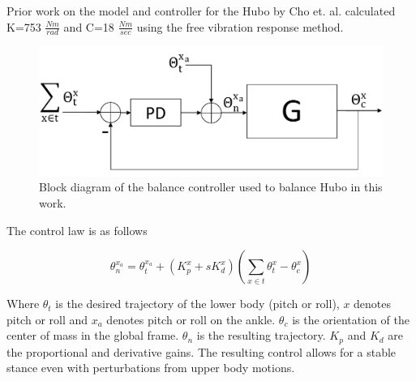 Prior work on the model and controller for the Hubo by Cho et. al. calculated K=753 $\frac{Nm}{rad}$ and C=18 $\frac{Nm}{sec}$ using the free vibration response method\cite{5379574}.


\begin{figure}[ht]
  \centering
\includegraphics[width=1.0\columnwidth]{./pix/blockDiagram3.pdf}
  \caption{Block diagram of the balance controller used to balance Hubo in this work.}
  \label{fig:ctrlBlockDiagram}
\end{figure}

The control law is as follows

\begin{equation}
\theta_n^{x_a} = \theta_t^{x_a} + \left(K_p^x+sK_d^x\right)\left(\sum\limits_{x \in t} \theta_{t}^x - \theta_{c}^x\right)
\end{equation}

Where $\theta_t$ is the desired trajectory of the lower body (pitch or roll), $x$ denotes pitch or roll and $x_a$ denotes pitch or roll on the ankle.  $\theta_{c}$ is the orientation of the center of mass in the global frame.  $\theta_n$ is the resulting trajectory.  $K_p$ and $K_d$ are the proportional and derivative gains.  The resulting control allows for a stable stance even with perturbations from upper body motions.
